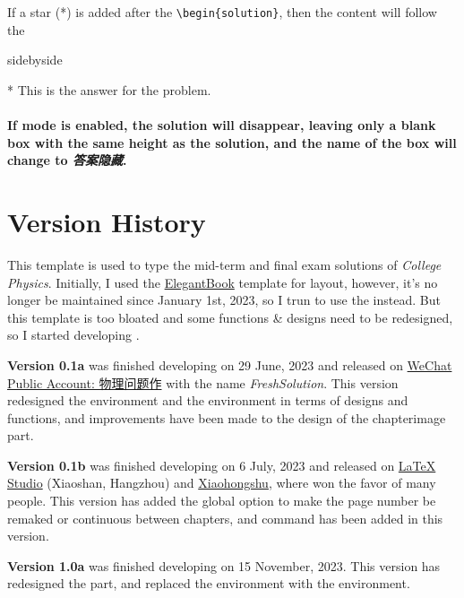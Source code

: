 If a star (*) is added after the \verb|\begin{solution}|, then the content will follow the 
\begin{tcblisting}{sidebyside}
\begin{solution}*
    This is the answer for the problem.
\end{solution}
\end{tcblisting}

\paragraph{If mode  is enabled, the solution will disappear, leaving only a blank box with the same height as the solution, and the name of the box will change to \emph{\textcolor{1号色}{\textbf{ 答案隐藏}}}.}

\newpage
\section{Version History}
This template is used to type the mid-term and final exam solutions of \emph{College Physics}. Initially, I used the \href{https://www.ctan.org/pkg/elegantbook}{ElegantBook} template for layout, however, it's no longer be maintained since January 1st, 2023, so I trun to use the \href{https://github.com/Azure1210/VividBooK}{} instead. But this template is too bloated and some functions \& designs need to be redesigned, so I started developing .

\textsf{\bfseries Version 0.1a} was finished developing on 29 June, 2023 and released on \href{https://mp.weixin.qq.com/s/kd4StYk3XybhNQZkAfoY6A}{ WeChat Public Account: 物理问题作} with the name \emph{FreshSolution}. This version redesigned the  environment and the  environment in terms of designs and functions, and improvements have been made to the design of the chapterimage part.

\textsf{\bfseries Version 0.1b} was finished developing on 6 July, 2023 and released on \href{https://www.latexstudio.net/index/details/index/mid/3553.html}{LaTeX Studio} (Xiaoshan, Hangzhou) and \href{http://xhslink.com/YBuuuw}{Xiaohongshu}, where won the favor of many people. This version has added the global option to make the page number be remaked or continuous between chapters, and command  has been added in this version.

\textsf{\bfseries Version 1.0a} was finished developing on 15 November, 2023. This version has redesigned the  part,  and replaced the  environment with the  environment.

